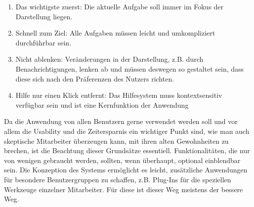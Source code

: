 \begin{enumerate}\itemsep -5pt
\item{Das wichtigste zuerst: Die aktuelle Aufgabe soll immer im Fokus der Darstellung liegen.}
\item{Schnell zum Ziel: Alle Aufgaben müssen leicht und umkompliziert durchführbar sein.}
\item{Nicht ablenken: Veränderungen in der Darstellung, z.B. durch Benachrichtigungen, lenken ab und müssen deswegen so gestaltet sein, dass diese sich nach den Präferenzen des Nutzers richten.}
\item{Hilfe nur einen Klick entfernt: Das Hilfesystem muss kontextsensitiv verfügbar sein und ist eine Kernfunktion der Anwendung}
\end{enumerate}

Da die Anwendung von allen Benutzern gerne verwendet werden soll und vor allem die Usability und die Zeitersparnis ein wichtiger Punkt sind, wie man auch skeptische Mitarbeiter überzeugen kann, mit ihren alten Gewohnheiten zu brechen, ist die Beachtung dieser Grundsätze essentiell. Funktionalitäten, die nur von wenigen gebraucht werden, sollten, wenn überhaupt, optional einblendbar sein. Die Konzeption des Systems ermöglicht es leicht, zusätzliche Anwendungen für besondere Benutzergruppen zu schaffen, z.B. Plug-Ins für die speziellen Werkzeuge einzelner Mitarbeiter. Für diese  ist dieser Weg meistens der bessere Weg.

